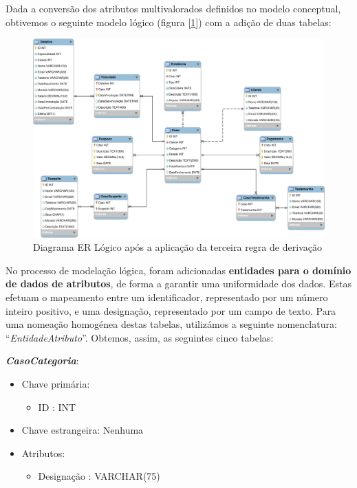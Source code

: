 \documentclass[a4paper,12pt]{scrreprt}
\begin{document}
        \vspace{0.5cm}

        Dada a conversão dos atributos multivalorados definidos no modelo conceptual, obtivemos o seguinte modelo lógico (figura [\ref{fig:4.3}]) com a adição de duas tabelas:

        \clearpage
        \begin{figure}[!ht]
            \centering
            \includegraphics[scale=1, angle=270]{images/modelo_logico/regra3.pdf}
            \caption{Diagrama ER Lógico após a aplicação da terceira regra de derivação}
            \label{fig:4.3}
        \end{figure}
    

        \clearpage

        No processo de modelação lógica, foram adicionadas \textbf{entidades para o domínio de dados de atributos}, de forma a garantir uma uniformidade dos dados. Estas efetuam o mapeamento entre um identificador, representado por um número inteiro positivo, e uma designação, representado por um campo de texto. Para uma nomeação homogénea destas tabelas, utilizámos a seguinte nomenclatura: “\textit{EntidadeAtributo}”. Obtemos, assim, as seguintes cinco tabelas:

        \textbf{\textit{CasoCategoria}}:
        \begin{itemize}
            \item Chave primária:
                \begin{itemize}
                    \item ID : INT
                \end{itemize}
            \item Chave estrangeira: Nenhuma
            \item Atributos:
                \begin{itemize}
                    \item Designação : VARCHAR(75)
                \end{itemize}
        \end{itemize}
\end{document}
